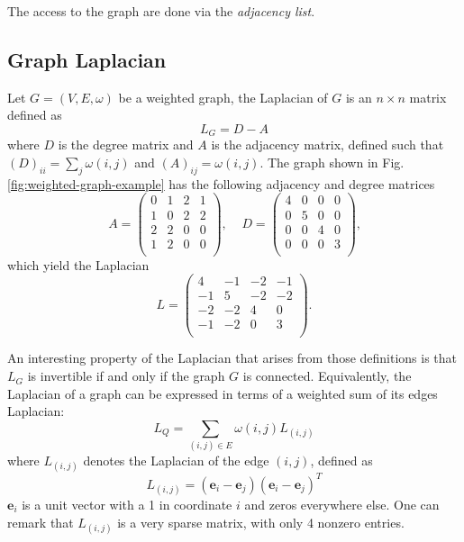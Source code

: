 The access to the graph are done via the \textit{adjacency list}.

\subsection{Graph Laplacian}
Let $G = (V, E, \omega)$ be a weighted graph, the Laplacian of $G$ is an $n
\times n$ matrix defined as
\begin{equation}
    L_G = D - A
\end{equation}
where $D$ is the degree matrix and $A$ is the adjacency matrix, defined
such that $(D)_{ii} = \sum_j \omega(i,j)$ and $(A)_{ij} = \omega(i,j)$. The
graph shown in Fig. \ref{fig:weighted-graph-example} has the following adjacency
and degree matrices
\begin{equation*}
    A = \begin{pmatrix}
        0 & 1 & 2 & 1 \\
        1 & 0 & 2 & 2 \\
        2 & 2 & 0 & 0 \\
        1 & 2 & 0 & 0 \\
    \end{pmatrix} \text{,} \;
    \quad
    D = \begin{pmatrix}
        4 & 0 & 0 & 0 \\
        0 & 5 & 0 & 0 \\
        0 & 0 & 4 & 0 \\
        0 & 0 & 0 & 3 \\
    \end{pmatrix} \text{,}
\end{equation*}
which yield the Laplacian
\begin{equation*}
    L = \begin{pmatrix}
        4 & -1 & -2 & -1 \\
        -1 & 5 & -2 & -2 \\
        -2 & -2 & 4 & 0 \\
        -1 & -2 & 0 & 3 \\
    \end{pmatrix} \text{.}
\end{equation*}

An interesting property of the Laplacian that arises from those definitions is
that $L_G$ is invertible if and only if the graph $G$ is connected.
Equivalently, the Laplacian of a graph can be expressed in terms of a weighted
sum of its edges Laplacian:
\begin{equation}
    L_Q = \sum_{(i,j)\in E} \omega(i,j)L_{(i,j)}
\end{equation}
where $L_{(i,j)}$ denotes the Laplacian of the edge $(i,j)$, defined as
\begin{equation}
    L_{(i,j)} = (\boldsymbol e_i - \boldsymbol e_j)(\boldsymbol e_i - \boldsymbol e_j)^T
\end{equation}
$\boldsymbol e_i$ is a unit vector with a 1 in coordinate $i$ and zeros
everywhere else. One can remark that $L_{(i,j)}$ is a very sparse matrix, with
only 4 nonzero entries.


